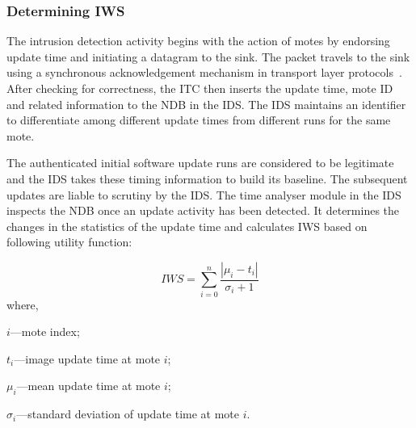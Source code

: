 \documentclass[conference,final]{IEEEtran}
\newcommand{\notedme}[1]{\raisebox{0pt}[0pt][0pt]{\pdfcomment[open=true,color=blue]{#1}}}
\begin{document}
\subsubsection*{Determining IWS}
\label{ssc:cal_iws}
The intrusion detection activity begins with the action of motes by endorsing update time and initiating a datagram to the sink. 
The packet travels to the sink using a synchronous acknowledgement mechanism in transport layer protocols~\cite{tep116}.
After checking for correctness, the ITC then inserts the update time, mote ID and related information to the NDB in the IDS.
The IDS maintains an identifier to differentiate among different update times from different runs for the same mote.
%

The authenticated initial software update runs are considered to be legitimate and the IDS takes these timing information to build its baseline.
The subsequent updates are liable to scrutiny by the IDS.
The time analyser module in the IDS inspects the NDB once an update activity has been detected.
It determines the changes in the statistics of the update time and calculates IWS based on following utility function:

\begin{equation}
\label{eqn2} 
	\mathit{IWS} = \sum \limits_{i=0}^{n} \frac{\left| \mu_i - t_i \right|}{\sigma_i + 1}
\end{equation}
where, 
\begin{inparaenum}
\item $\mathit{i}$---mote index;%
\item $\mathit{t_i}$---image update time at mote $\mathit{i}$; 
\item $\mathit{\mu_i}$---mean update time at mote $\mathit{i}$; 
\item $\mathit{\sigma_i}$---standard deviation of update time at mote $\mathit{i}$.
\end{inparaenum}	
\end{document}

